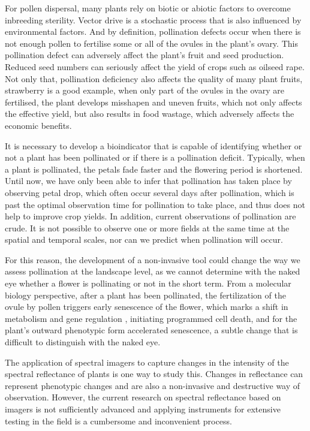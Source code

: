 \documentclass[11pt,a4paper]{article}
\begin{document}
\begin{spacing}{1.5}
For pollen dispersal, many plants rely on biotic or abiotic factors to overcome inbreeding sterility. Vector drive is a stochastic process that is also influenced by environmental factors.\citep{badillo2019pollinator} And by definition, pollination defects occur when there is not enough pollen to fertilise some or all of the ovules in the plant's ovary.\citep{wilcock2002pollination} This pollination defect can adversely affect the plant's fruit and seed production.\citep{wietzke2018insect} Reduced seed numbers can seriously affect the yield of crops such as oilseed rape. Not only that, pollination deficiency also affects the quality of many plant fruits, strawberry is a good example, when only part of the ovules in the ovary are fertilised, the plant develops misshapen and uneven fruits, which not only affects the effective yield, but also results in food wastage, which adversely affects the economic benefits.\citep{katumo2022pollinator}

It is necessary to develop a bioindicator that is capable of identifying whether or not a plant has been pollinated or if there is a pollination deficit. Typically, when a plant is pollinated, the petals fade faster and the flowering period is shortened. Until now, we have only been able to infer that pollination has taken place by observing petal drop, which often occur several days after pollination, which is past the optimal observation time for pollination to take place, and thus does not help to improve crop yields.\citep{bagniewska2016mystery} In addition, current observations of pollination are crude. It is not possible to observe one or more fields at the same time at the spatial and temporal scales, nor can we predict when pollination will occur.

For this reason, the development of a non-invasive tool could change the way we assess pollination at the landscape level, as we cannot determine with the naked eye whether a flower is pollinating or not in the short term. From a molecular biology perspective, after a plant has been pollinated, the fertilization of the ovule by pollen triggers early senescence of the flower, which marks a shift in metabolism and gene regulation \citep{van2008physiology}, initiating programmed cell death, and for the plant's outward phenotypic form accelerated senescence, a subtle change that is difficult to distinguish with the naked eye.

The application of spectral imagers to capture changes in the intensity of the spectral reflectance of plants is one way to study this.\citep{ilyinska2021alyssum} Changes in reflectance can represent phenotypic changes and are also a non-invasive and destructive way of observation. However, the current research on spectral reflectance based on imagers is not sufficiently advanced and applying instruments for extensive testing in the field is a cumbersome and inconvenient process.


\end{spacing}
\end{document}
